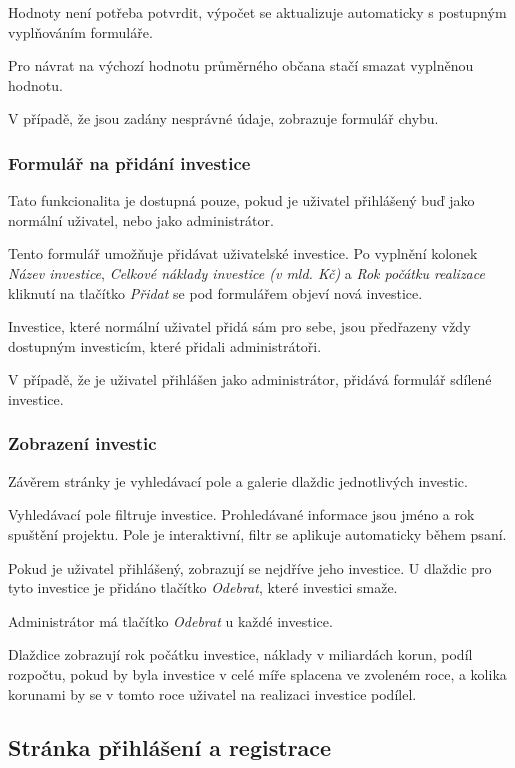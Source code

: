 \documentclass[11pt,a4paper,twoside,openright]{report}
\begin{document}
Hodnoty není potřeba potvrdit, výpočet se aktualizuje automaticky s postupným
vyplňováním formuláře.

Pro návrat na výchozí hodnotu průměrného občana stačí smazat vyplněnou hodnotu.

V případě, že jsou zadány nesprávné údaje, zobrazuje formulář chybu.

\subsubsection{Formulář na přidání investice}

Tato funkcionalita je dostupná pouze, pokud je uživatel přihlášený buď jako
normální uživatel, nebo jako administrátor.

Tento formulář umožňuje přidávat uživatelské investice. Po vyplnění kolonek
\emph{Název investice}, \emph{Celkové náklady investice (v mld. Kč)} a
\emph{Rok počátku realizace} kliknutí na tlačítko \emph{Přidat} se pod formulářem
objeví nová investice.

Investice, které normální uživatel přidá sám pro sebe, jsou předřazeny vždy dostupným investicím,
které přidali administrátoři.

V případě, že je uživatel přihlášen jako administrátor, přidává formulář
sdílené investice.

\subsubsection{Zobrazení investic}
Závěrem stránky je vyhledávací pole a galerie dlaždic jednotlivých investic.

Vyhledávací pole filtruje investice. Prohledávané informace jsou jméno a rok
spuštění projektu. Pole je interaktivní, filtr se aplikuje automaticky
během psaní.

Pokud je uživatel přihlášený, zobrazují se nejdříve jeho investice. U dlaždic
pro tyto investice je přidáno tlačítko \emph{Odebrat}, které investici smaže.

Administrátor má tlačítko \emph{Odebrat} u každé investice.

Dlaždice zobrazují rok počátku investice, náklady v miliardách korun, podíl
rozpočtu, pokud by byla investice v celé míře splacena ve zvoleném roce, a
kolika korunami by se v tomto roce uživatel na realizaci investice podílel.

\subsection{Stránka přihlášení a registrace}
\end{document}
